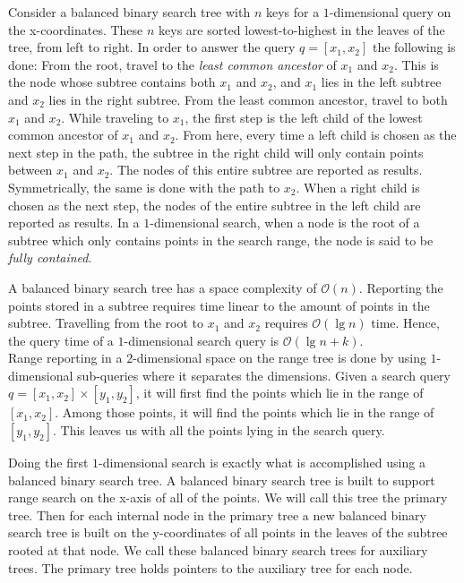 Consider a balanced binary search tree with $n$ keys for a $1$-dimensional query on the x-coordinates. These $n$ keys are sorted lowest-to-highest in the leaves of the tree, from left to right. In order to answer the query $q = [x_1, x_2]$ the following is done: From the root, travel to the \emph{least common ancestor} of $x_1$ and $x_2$. This is the node whose subtree contains both $x_1$ and $x_2$, and $x_1$ lies in the left subtree and $x_2$ lies in the right subtree. From the least common ancestor, travel to both $x_1$ and $x_2$. While traveling to $x_1$, the first step is the left child of the lowest common ancestor of $x_1$ and $x_2$. From here, every time a left child is chosen as the next step in the path, the subtree in the right child will only contain points between $x_1$ and $x_2$. The nodes of this entire subtree are reported as results. Symmetrically, the same is done with the path to $x_2$. When a right child is chosen as the next step, the nodes of the entire subtree in the left child are reported as results. In a $1$-dimensional search, when a node is the root of a subtree which only contains points in the search range, the node is said to be \emph{fully contained}.

A balanced binary search tree has a space complexity of $\mathcal{O}(n)$. Reporting the points stored in a subtree requires time linear to the amount of points in the subtree. Travelling from the root to $x_1$ and $x_2$ requires $\mathcal{O}(\lg n)$ time. Hence, the query time of a $1$-dimensional search query is $\mathcal{O}(\lg n + k)$.\\

Range reporting in a $2$-dimensional space on the range tree is done by using $1$-dimensional sub-queries where it separates the dimensions. Given a search query $q = [x_1, x_2] \times [y_1, y_2]$, it will first find the points which lie in the range of $[x_1, x_2]$. Among those points, it will find the points which lie in the range of $[y_1, y_2]$. This leaves us with all the points lying in the search query.

Doing the first $1$-dimensional search is exactly what is accomplished using a balanced binary search tree. A balanced binary search tree is built to support range search on the x-axis of all of the points. We will call this tree the primary tree. Then for each internal node in the primary tree a new balanced binary search tree is built on the y-coordinates of all points in the leaves of the subtree rooted at that node. We call these balanced binary search trees for auxiliary trees. The primary tree holds pointers to the auxiliary tree for each node.

